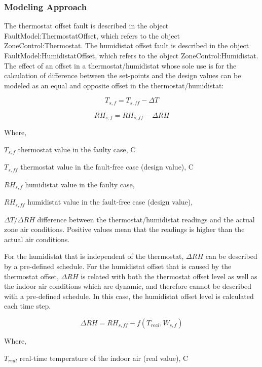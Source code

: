 \subsubsection{Modeling Approach}\label{modeling-approach-1}

The thermostat offset fault is described in the object FaultModel:ThermostatOffset, which refers to the object ZoneControl:Thermostat. The humidistat offset fault is described in the object FaultModel:HumidistatOffset, which refers to the object ZoneControl:Humidistat. The effect of an offset in a thermostat/humidistat whose sole use is for the calculation of difference between the set-points and the design values can be modeled as an equal and opposite offset in the thermostat/humidistat:

\begin{equation}
T_{s,f} = T_{s,ff}  - \Delta T
\end{equation}

\begin{equation}
RH_{s,f} = RH_{s,ff}  - \Delta RH
\end{equation}

Where,

\(T_{s,f}\) thermostat value in the faulty case, C

\(T_{s,ff}\) thermostat value in the fault-free case (design value), C

\(RH_{s,f}\) humidistat value in the faulty case,

\(RH_{s,ff}\) humidistat value in the fault-free case (design value),

\(\Delta T / \Delta RH\) difference between the thermostat/humidistat readings and the actual zone air conditions. Positive values mean that the readings is higher than the actual air conditions.

For the humidistat that is independent of the thermostat, \(\Delta RH\) can be described by a pre-defined schedule. For the humidistat offset that is caused by the thermostat offset, \(\Delta RH\) is related with both the thermostat offset level as well as the indoor air conditions which are dynamic, and therefore cannot be described with a pre-defined schedule. In this case, the humidistat offset level is calculated each time step.

\begin{equation}
\Delta RH = RH_{s,ff} - f(T_{real}, W_{s,f})
\end{equation}

Where,

\(T_{real}\) real-time temperature of the indoor air (real value), C

